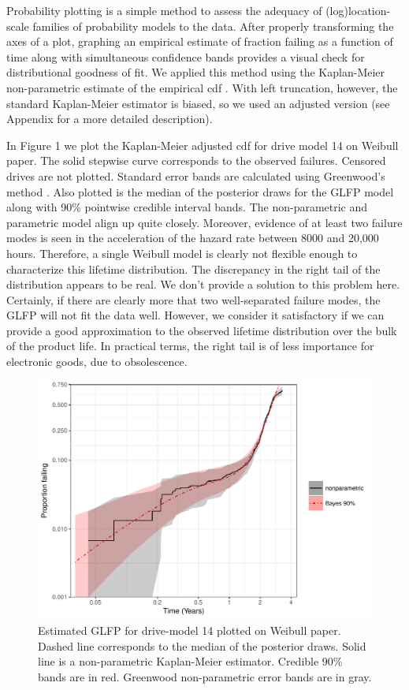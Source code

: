 \documentclass[12pt]{article}
\begin{document}
Probability plotting is a simple method to assess the adequacy of (log)location-scale families of probability models to the data.  After properly transforming the axes of a plot, graphing an empirical estimate of fraction failing as a function of time along with simultaneous confidence bands provides a visual check for distributional goodness of fit.  We applied this method using the Kaplan-Meier non-parametric estimate of the empirical cdf \cite{kaplan}.  With left truncation, however, the standard Kaplan-Meier estimator is biased, so we used an adjusted version (see Appendix for a more detailed description).   

In Figure 1 we plot the Kaplan-Meier adjusted cdf for drive model 14 on Weibull paper.  The solid stepwise curve corresponds to the observed failures.  Censored drives are not plotted.  Standard error bands are calculated using Greenwood's method \cite{green}.  Also plotted is the median of the posterior draws for the GLFP model along with 90\% pointwise credible interval bands.  The non-parametric and parametric model align up quite closely.  Moreover, evidence of at least two failure modes is seen in the acceleration of the hazard rate between 8000 and 20,000 hours.  Therefore, a single Weibull model is clearly not flexible enough to characterize this lifetime distribution. The discrepancy in the right tail of the distribution appears to be real. We don't provide a solution to this problem here. Certainly, if there are clearly more that two well-separated failure modes, the GLFP will not fit the data well. However, we consider it satisfactory if we can provide a good approximation to the observed lifetime distribution over the bulk of the product life. In practical terms, the right tail is of less importance for electronic goods, due to obsolescence.

\begin{figure}[H]
\centering
  \includegraphics[width=.8\textwidth]{mod14_example1.pdf}
  \caption{Estimated GLFP for drive-model 14 plotted on Weibull paper.  Dashed line corresponds to the median of the posterior draws.  Solid line is a non-parametric Kaplan-Meier estimator.  Credible 90\% bands are in red.  Greenwood non-parametric error bands are in gray.}
  \label{fig1}
\end{figure}
\end{document}
